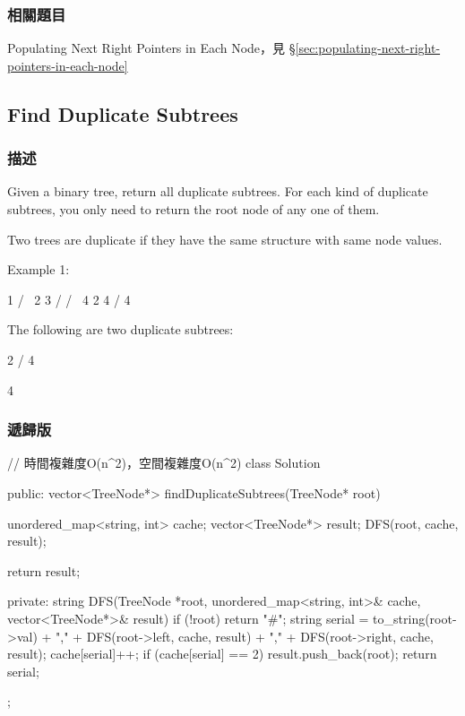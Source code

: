 \subsubsection{相關題目}
\begindot
\item Populating Next Right Pointers in Each Node，見 \S \ref{sec:populating-next-right-pointers-in-each-node}
\myenddot

\subsection{Find Duplicate Subtrees} %
\label{sec:find-duplicate-subtrees}


\subsubsection{描述}
Given a binary tree, return all duplicate subtrees. For each kind of duplicate subtrees, you only need to return the root node of any one of them.

Two trees are duplicate if they have the same structure with same node values.

Example 1:
\begin{Code}
        1
       / \
      2   3
     /   / \
    4   2   4
       /
      4
\end{Code}

The following are two duplicate subtrees:
\begin{Code}
      2
     /
    4
\end{Code}

\begin{Code}
    4
\end{Code}

\subsubsection{遞歸版}
\begin{Code}
// 時間複雜度O(n^2)，空間複雜度O(n^2)
class Solution {
public:
    vector<TreeNode*> findDuplicateSubtrees(TreeNode* root) {
        unordered_map<string, int> cache;
        vector<TreeNode*> result;
        DFS(root, cache, result);

        return result;
    }
private:
    string DFS(TreeNode *root, unordered_map<string, int>& cache, vector<TreeNode*>& result)
    {
        if (!root) return "#";
        string serial = to_string(root->val) + "," + DFS(root->left, cache, result)
            + "," + DFS(root->right, cache, result);
        cache[serial]++;
        if (cache[serial] == 2)
            result.push_back(root);
        return serial;
    }
};
\end{Code}

